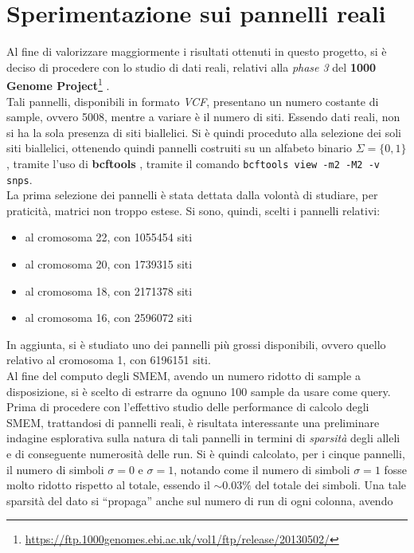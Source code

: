 \section{Sperimentazione sui pannelli reali}
Al fine di valorizzare maggiormente i risultati ottenuti in questo progetto, si
è deciso di procedere con lo studio di dati reali, relativi alla \textit{phase
  3} del \textbf{1000
  Genome
  Project}\footnote{\url{https://ftp.1000genomes.ebi.ac.uk/vol1/ftp/release/20130502/}}
\cite{1kgp}.\\ 
Tali pannelli, disponibili in formato \textit{VCF}, presentano un numero
costante di sample, ovvero 5008, mentre a variare è il numero di siti. Essendo
dati reali, non si ha la sola presenza di siti biallelici. Si è quindi proceduto
alla selezione dei soli siti biallelici, ottenendo quindi pannelli costruiti su
un alfabeto binario $\Sigma=\{0,1\}$, tramite l'uso di \textbf{bcftools}
\cite{bcftools}, tramite il comando \texttt{bcftools view -m2 -M2
  -v snps}.\\
La prima selezione dei pannelli è stata dettata dalla volontà di studiare, per
praticità, matrici non troppo estese. Si sono, quindi, scelti i pannelli
relativi:
\begin{itemize}
  \item al cromosoma 22, con 1055454 siti
  \item al cromosoma 20, con 1739315 siti
  \item al cromosoma 18, con 2171378 siti
  \item al cromosoma 16, con 2596072 siti
\end{itemize}
In aggiunta, si è studiato uno dei pannelli più grossi disponibili, ovvero
quello relativo al cromosoma 1, con 6196151 siti.\\
Al fine del computo degli SMEM, avendo un numero ridotto di sample a
disposizione, si è scelto di estrarre da ognuno 100 sample da usare come
query.\\
Prima di procedere con l'effettivo studio delle performance di calcolo degli
SMEM, trattandosi di pannelli reali, è risultata interessante una preliminare
indagine esplorativa sulla natura di tali pannelli in termini di
\textit{sparsità} degli alleli e di conseguente numerosità delle run. Si è
quindi calcolato, per i cinque pannelli, il numero di simboli $\sigma=0$ e
$\sigma=1$, notando come il numero di simboli $\sigma=1$ fosse molto ridotto
rispetto al totale, essendo il $\sim 0.03\%$ del totale dei simboli. Una tale
sparsità del dato si ``propaga'' anche sul numero di run di ogni colonna, avendo
